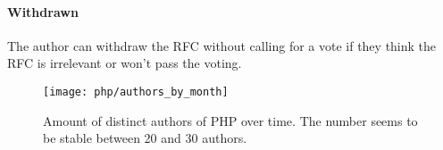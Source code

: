 \paragraph{Withdrawn}

The author can withdraw the \ac{RFC} without calling for a vote if they think
the \ac{RFC} is irrelevant or won't pass the voting.

\begin{figure}[htbp]
  \centering
  \texttt{[image: php/authors\_by\_month]}
  \caption[Authors by month, PHP]
  {Amount of distinct authors of PHP over time. The number seems to be stable
    between 20 and 30 authors.}
\end{figure}


